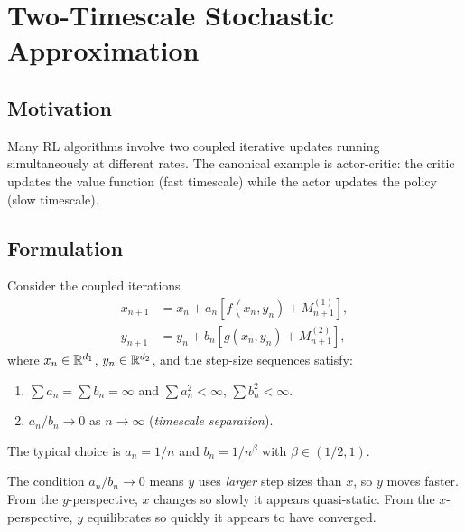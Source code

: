 \documentclass[11pt,a4paper]{article}
\begin{document}

\section{Two-Timescale Stochastic Approximation}
\label{sec:two-timescale}

\subsection{Motivation}

Many RL algorithms involve two coupled iterative updates running
simultaneously at different rates. The canonical example is
actor-critic: the critic updates the value function (fast timescale)
while the actor updates the policy (slow timescale).

\subsection{Formulation}

\begin{definition}
\label{def:two-timescale}
Consider the coupled iterations
\begin{align}
  x_{n+1} &= x_n + a_n[f(x_n, y_n) + M_{n+1}^{(1)}],
    \label{eq:slow} \\
  y_{n+1} &= y_n + b_n[g(x_n, y_n) + M_{n+1}^{(2)}],
    \label{eq:fast}
\end{align}
where $x_n \in \mathbb{R}^{d_1}$, $y_n \in \mathbb{R}^{d_2}$, and the step-size
sequences satisfy:
\begin{enumerate}[label=(\roman*)]
  \item $\sum a_n = \sum b_n = \infty$ and $\sum a_n^2 < \infty$,
    $\sum b_n^2 < \infty$.
  \item $a_n/b_n \to 0$ as $n \to \infty$
    \quad (\emph{timescale separation}).
\end{enumerate}
The typical choice is $a_n = 1/n$ and $b_n = 1/n^\beta$ with
$\beta \in (1/2, 1)$.
\end{definition}

\begin{remark}
\label{rem:timescale}
The condition $a_n/b_n \to 0$ means $y$ uses \emph{larger} step
sizes than $x$, so $y$ moves faster. From the $y$-perspective,
$x$ changes so slowly it appears quasi-static. From the
$x$-perspective, $y$ equilibrates so quickly it appears to have
converged.
\end{remark}
\end{document}
